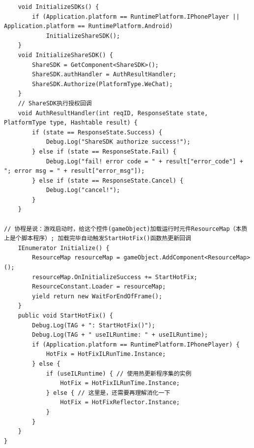 \documentclass[9pt, b5paper]{article}
\begin{document}
\begin{verbatim}
    void InitializeSDKs() {
        if (Application.platform == RuntimePlatform.IPhonePlayer || Application.platform == RuntimePlatform.Android) 
            InitializeShareSDK();
    }
    void InitializeShareSDK() {
        ShareSDK = GetComponent<ShareSDK>();
        ShareSDK.authHandler = AuthResultHandler;
        ShareSDK.Authorize(PlatformType.WeChat);
    }
    // ShareSDK执行授权回调
    void AuthResultHandler(int reqID, ResponseState state, PlatformType type, Hashtable result) {
        if (state == ResponseState.Success) {
            Debug.Log("ShareSDK authorize success!");
        } else if (state == ResponseState.Fail) {
            Debug.Log("fail! error code = " + result["error_code"] + "; error msg = " + result["error_msg"]);
        } else if (state == ResponseState.Cancel) {
            Debug.Log("cancel!");
        }
    }

// 协程是说：游戏启动时，给这个控件(gameObject)加载运行时元件ResourceMap（本质上是个脚本程序）; 加载完毕自动触发StartHotFix()函数热更新回调
    IEnumerator Initialize() { 
        ResourceMap resourceMap = gameObject.AddComponent<ResourceMap>();
        resourceMap.OnInitializeSuccess += StartHotFix;
        ResourceConstant.Loader = resourceMap;
        yield return new WaitForEndOfFrame();
    }
    public void StartHotFix() {
        Debug.Log(TAG + ": StartHotFix()");
        Debug.Log(TAG + " useILRuntime: " + useILRuntime); 
        if (Application.platform == RuntimePlatform.IPhonePlayer) {
            HotFix = HotFixILRunTime.Instance;
        } else {
            if (useILRuntime) { // 使用热更新程序集的实例
                HotFix = HotFixILRunTime.Instance;
            } else { // 这里是，还需要再理解消化一下
                HotFix = HotFixReflector.Instance;
            }
        }
    }
}
\end{verbatim}
\end{document}
